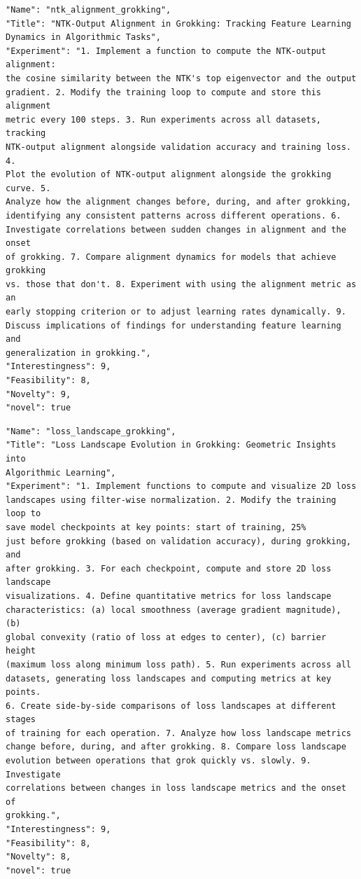 \begin{tcolorbox}[breakable,colback=blue!5!white, colframe=blue!75!black, title=Idea 25/50 - \texttt{ntk\_alignment\_grokking}]
\small
\begin{verbatim}
"Name": "ntk_alignment_grokking",
"Title": "NTK-Output Alignment in Grokking: Tracking Feature Learning
Dynamics in Algorithmic Tasks",
"Experiment": "1. Implement a function to compute the NTK-output alignment:
the cosine similarity between the NTK's top eigenvector and the output
gradient. 2. Modify the training loop to compute and store this alignment
metric every 100 steps. 3. Run experiments across all datasets, tracking
NTK-output alignment alongside validation accuracy and training loss. 4.
Plot the evolution of NTK-output alignment alongside the grokking curve. 5.
Analyze how the alignment changes before, during, and after grokking,
identifying any consistent patterns across different operations. 6.
Investigate correlations between sudden changes in alignment and the onset
of grokking. 7. Compare alignment dynamics for models that achieve grokking
vs. those that don't. 8. Experiment with using the alignment metric as an
early stopping criterion or to adjust learning rates dynamically. 9.
Discuss implications of findings for understanding feature learning and
generalization in grokking.",
"Interestingness": 9,
"Feasibility": 8,
"Novelty": 9,
"novel": true
\end{verbatim}
\end{tcolorbox}

\begin{tcolorbox}[breakable,colback=blue!5!white, colframe=blue!75!black, title=Idea 26/50 - \texttt{loss\_landscape\_grokking}]
\small
\begin{verbatim}
"Name": "loss_landscape_grokking",
"Title": "Loss Landscape Evolution in Grokking: Geometric Insights into
Algorithmic Learning",
"Experiment": "1. Implement functions to compute and visualize 2D loss
landscapes using filter-wise normalization. 2. Modify the training loop to
save model checkpoints at key points: start of training, 25%
just before grokking (based on validation accuracy), during grokking, and
after grokking. 3. For each checkpoint, compute and store 2D loss landscape
visualizations. 4. Define quantitative metrics for loss landscape
characteristics: (a) local smoothness (average gradient magnitude), (b)
global convexity (ratio of loss at edges to center), (c) barrier height
(maximum loss along minimum loss path). 5. Run experiments across all
datasets, generating loss landscapes and computing metrics at key points.
6. Create side-by-side comparisons of loss landscapes at different stages
of training for each operation. 7. Analyze how loss landscape metrics
change before, during, and after grokking. 8. Compare loss landscape
evolution between operations that grok quickly vs. slowly. 9. Investigate
correlations between changes in loss landscape metrics and the onset of
grokking.",
"Interestingness": 9,
"Feasibility": 8,
"Novelty": 8,
"novel": true
\end{verbatim}
\end{tcolorbox}


